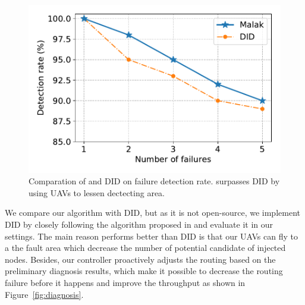 \begin{figure}[!h]
	\centering
	\includegraphics[width=.95\columnwidth]{Figure/did_comp_curve}
	\vspace{-0.1in}
	\caption{Comparation of {\sdn} and DID on failure detection rate.
		\textnormal{
			{\sdn} surpasses DID by using UAVs to lessen dectecting area.
		}}
	\label{fig:did_comp}
\end{figure}

We compare our algorithm with DID\cite{gong2015directional}, but as it is not
open-source, we implement DID by closely following the algorithm proposed in
\cite{gong2015directional} and evaluate it in our settings. The main reason
{\sdn} performs better than DID is that our UAVs can fly to a the fault area
which decrease the number of potential candidate of injected nodes. Besides, our
controller proactively adjusts the routing based on the preliminary diagnosis
results, which make it possible to decrease the routing failure before it
happens and improve the throughput as shown in Figure~\ref{fig:diagnosis}.

